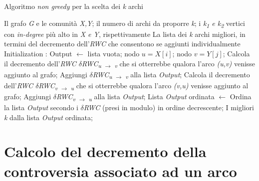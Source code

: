 \begin{algorithm}
\caption{Algoritmo \textit{non greedy} per la scelta dei \textit{k} archi}
\begin{algorithmic} 
\REQUIRE Il grafo \textit{G} e le comunità \textit{X,Y}; il numero di archi da proporre \textit{k}; i \textit{k\textsubscript{1} e k\textsubscript{2}} vertici con \textit{in-degree} più alto in \textit{X e Y}, rispettivamente 
\ENSURE La lista dei \textit{k} archi migliori, in termini del decremento dell'\textit{RWC} che consentono se aggiunti individualmente
\STATE Initialization : Output $\leftarrow$ lista vuota;
\STATE nodo $u = X[i]$;
\STATE nodo $v = Y[j]$;
\STATE Calcola il decremento dell'\textit{RWC $\delta$RWC\textsubscript{u $\rightarrow$ v}} che si otterrebbe qualora l'arco \textit{(u,v)} venisse aggiunto al grafo;
\STATE Aggiungi \textit{$\delta$RWC\textsubscript{u $\rightarrow$ v}} alla lista \textit{Output};
\STATE Calcola il decremento dell'\textit{RWC $\delta$RWC\textsubscript{v $\rightarrow$ u}} che si otterrebbe qualora l'arco \textit{(v,u)} venisse aggiunto al grafo;
\STATE Aggiungi \textit{$\delta$RWC\textsubscript{v $\rightarrow$ u}} alla lista \textit{Output};
\ENDFOR
\ENDFOR
\STATE Lista \textit{Output} ordinata $\leftarrow$ Ordina la lista \textit{Output} secondo i \textit{$\delta$RWC} (presi in modulo) in ordine decrescente;
\RETURN I migliori \textit{k} dalla lista \textit{Output} ordinata;
\end{algorithmic}
\end{algorithm}

\section{Calcolo del decremento della controversia associato ad un arco}
